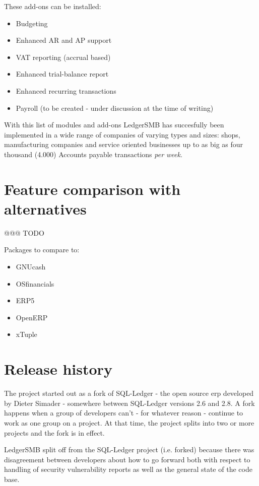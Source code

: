 These add-ons can be installed:
\begin{itemize}
\item Budgeting
\item Enhanced AR and AP support
\item VAT reporting (accrual based)
\item Enhanced trial-balance report
\item Enhanced recurring transactions
\item Payroll (to be created - under discussion at the time of writing)
\end{itemize}

With this list of modules and add-ons LedgerSMB has succesfully been implemented
in a wide range of companies of varying types and sizes: shops, manufacturing
companies and service oriented businesses up to as big as four thousand (4.000)
Accounts payable transactions \emph{per week}. 

\section{Feature comparison with alternatives}
\label{sec-ledgersmb-feature-comparison}
@@@ TODO

Packages to compare to:

\begin{itemize}
\item GNUcash
\item OSfinancials
\item ERP5
\item OpenERP
\item xTuple
\end{itemize}

\section{Release history}
\label{sec-ledgersmb-release-history}

The project started out as a fork of SQL-Ledger - the open source \gls{erp}
developed by Dieter Simader - somewhere between SQL-Ledger versions 2.6
and 2.8.  A fork happens when a group of developers can't - for whatever
reason - continue to work as one group on a project.  At that time, the
project splits into two or more projects and the fork is in effect.

LedgerSMB split off from the SQL-Ledger project (i.e. forked) because
there was disagreement between developers about how to go forward both with
respect to handling of security vulnerability reports as well as the general
state of the code base.

